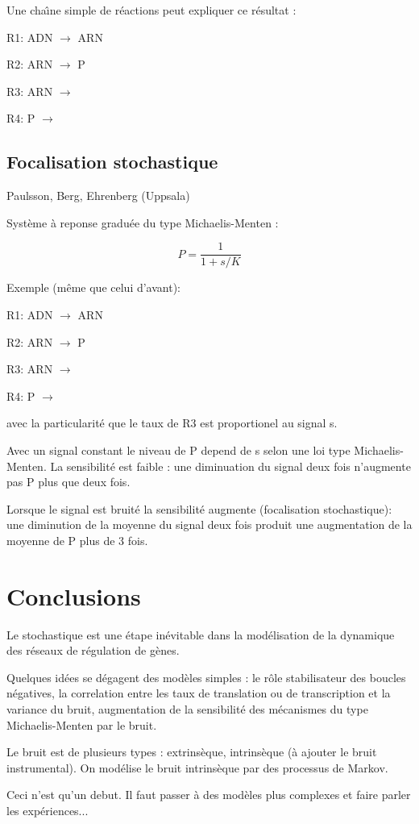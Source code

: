 \documentclass{article}
\def\magenta{\color{goldenrod}}
\begin{document}
Une cha{\^\i}ne simple de r{\'e}actions peut expliquer ce r{\'e}sultat :

\begin{description}
\item
R1: ADN $\rightarrow$ ARN
\item
R2: ARN $\rightarrow$ P
\item
R3: ARN $\rightarrow$
\item
R4: P $\rightarrow$
\end{description}


\section{\magenta \textsf{\Large  Focalisation stochastique }}

Paulsson, Berg, Ehrenberg (Uppsala)

Syst{\`e}me {\`a} reponse gradu{\'e}e du type Michaelis-Menten :

\begin{equation}
 P = \frac{1}{1+ s / K}
\end{equation}

Exemple (m{\^e}me que celui d'avant):

\begin{description}
\item
R1: ADN $\rightarrow$ ARN
\item
R2: ARN $\rightarrow$ P
\item
R3: ARN $\rightarrow$
\item
R4: P $\rightarrow$
\end{description}

avec la particularit{\'e} que le taux de R3 est proportionel au signal s.

Avec un signal constant le niveau de P depend de s selon une loi type
Michaelis-Menten.  La sensibilit{\'e} est faible : une diminuation du signal
deux fois n'augmente pas P plus que deux fois.

Lorsque le signal est bruit{\'e} la sensibilit{\'e} augmente (focalisation stochastique):
une diminution de la  moyenne du signal deux fois produit une augmentation de la
moyenne de P plus de 3 fois.


\chapter{\magenta \textsf{\Huge Conclusions }}

Le stochastique est une {\'e}tape in{\'e}vitable dans la mod{\'e}lisation
de la dynamique des r{\'e}seaux de r{\'e}gulation de g{\`e}nes.

Quelques id{\'e}es se d{\'e}gagent des mod{\`e}les simples : le  r{\^o}le stabilisateur
des boucles n{\'e}gatives, la correlation entre les taux de translation
ou de transcription et la variance du bruit, augmentation  de la sensibilit{\'e}
des m{\'e}canismes du type Michaelis-Menten par le bruit.

Le bruit est de plusieurs types : extrins{\`e}que, intrins{\`e}que ({\`a} ajouter le
bruit instrumental). On mod{\'e}lise le bruit intrins{\`e}que par des processus
de Markov.

Ceci n'est qu'un debut. Il faut passer {\`a} des mod{\`e}les plus complexes et
faire parler les exp{\'e}riences...
\end{document}
